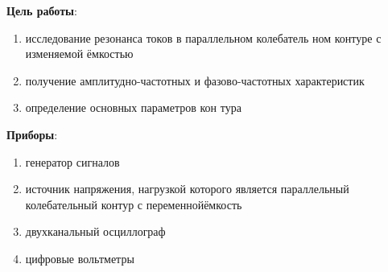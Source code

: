 \documentclass{report}
\begin{document}


\textbf{Цель работы}:
\begin{enumerate}
	\item исследование резонанса токов в параллельном колебатель­
	      ном контуре с изменяемой ёмкостью
	\item получение амплитудно-частотных и
	      фазово-частотных характеристик
	\item определение основных параметров кон­
	      тура
\end{enumerate}

\textbf{Приборы}:
\begin{enumerate}
	\item генератор сигналов
	\item источник напряжения, нагрузкой которого является параллельный
	      колебательный контур с пере­меннойёмкость
	\item двухканальный осциллограф
	\item цифровые вольтметры
\end{enumerate}
\end{document}
